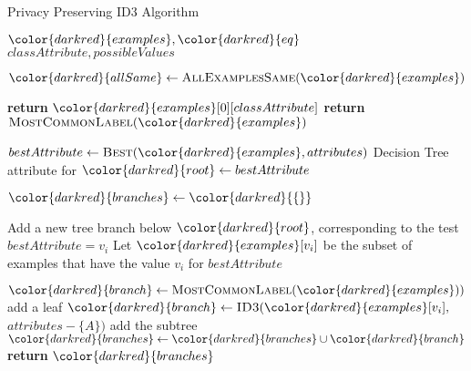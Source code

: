 \begin{algorithm}[t]
\caption{Privacy Preserving ID3 Algorithm }\label{a:id3-pp}
\begin{algorithmic}[1]
\renewcommand{\algorithmicrequire}{\textbf{Private Vars:}}
\Require ${\color{darkred}{examples}}, {\color{darkred}{eq}}$
\renewcommand{\algorithmicrequire}{\textbf{Global Vars:}}
\Require $classAttribute, possibleValues$

    \State ${\color{darkred}{allSame}} \gets \textsc{AllExamplesSame}({\color{darkred}{examples}})$

        \State \textbf{return} ${\color{darkred}{examples}}[0][classAttribute]$
        \State \textbf{return} $\textsc{MostCommonLabel}({\color{darkred}{examples}})$
    \EndIf

    \State $bestAttribute \gets \textsc{Best}({\color{darkred}{examples}}, attributes)$
    \State Decision Tree attribute for ${\color{darkred}{root}} \gets bestAttribute$ 

    \State ${\color{darkred}{branches}} \gets {\color{darkred}{\{\}}}$

        \State Add a new tree branch below ${\color{darkred}{root}}$, corresponding to the test $bestAttribute = v_i$
        \State Let ${\color{darkred}{examples}}[v_i]$ be the subset of examples that have the value $v_i$ for $bestAttribute$

            \State ${\color{darkred}{branch}} \gets \textsc{MostCommonLabel}({\color{darkred}{examples}}))$ add a leaf
        \Else
            \State ${\color{darkred}{branch}} \gets \textsc{ID3}({\color{darkred}{examples}}[v_i],$ $attributes - \{A\})$ add the subtree
        \EndIf
        \State ${\color{darkred}{branches}} \gets {\color{darkred}{branches}} \cup {\color{darkred}{branch}}$
    \EndFor
    \State \textbf{return} ${\color{darkred}{branches}}$

\EndProcedure

\end{algorithmic}
\end{algorithm}

